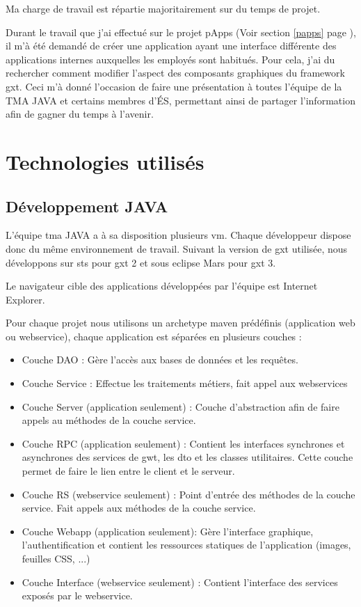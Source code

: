 \documentclass[12pt]{report}
\newcommand{\reference}[1]{(Voir section \ref{#1} page \pageref{#1})}
\begin{document}
    Ma charge de travail est répartie majoritairement sur du temps de projet.
    
    Durant le travail que j'ai effectué sur le projet pApps \reference{papps}, il m'à été demandé de créer une application ayant une interface différente des applications internes auxquelles les employés sont habitués. Pour cela, j'ai du rechercher comment modifier l'aspect des composants graphiques du framework \gls{gxt}. Ceci m'à donné l'occasion de faire une présentation à toutes l'équipe de la TMA JAVA et certains membres d'ÉS, permettant ainsi de partager l'information afin de gagner du temps à l'avenir.
    
    \newpage
    
    \section{Technologies utilisés}
    
    \subsection{Développement JAVA}
    L'équipe \gls{tma} JAVA a à sa disposition plusieurs \gls{vm}. Chaque développeur dispose donc du même environnement de travail. Suivant la version de \gls{gxt} utilisée, nous développons sur \gls{sts} pour \gls{gxt} 2 et sous \gls{eclipse} Mars pour \gls{gxt} 3.
    
    Le navigateur cible des applications développées par l'équipe est Internet Explorer.
    
    Pour chaque projet nous utilisons un archetype \gls{maven} prédéfinis (application web ou \gls{webservice}), chaque application est séparées en plusieurs couches :\vspace{-1em}
    \begin{itemize}[itemsep=0em]
        \item Couche DAO : Gère l'accès aux bases de données et les requêtes.
        \item Couche Service : Effectue les traitements métiers, fait appel aux \glspl{webservice}
        \item Couche Server (application seulement) : Couche d'abstraction afin de faire appels au méthodes de la couche service.
        \item Couche RPC (application seulement) : Contient les interfaces synchrones et asynchrones des services de \gls{gwt}, les \gls{dto} et les classes utilitaires. Cette couche permet de faire le lien entre le client et le serveur.
        \item Couche RS (\gls{webservice} seulement) : Point d'entrée des méthodes de la couche service. Fait appels aux méthodes de la couche service.
        \item Couche Webapp (application seulement): Gère l'interface graphique, l'authentification et contient les ressources statiques de l'application (images, feuilles CSS, ...)
        \item Couche Interface (\gls{webservice} seulement) : Contient l'interface des services exposés par le \gls{webservice}.
    \end{itemize}\vspace{-0.5em}
    
\end{document}
